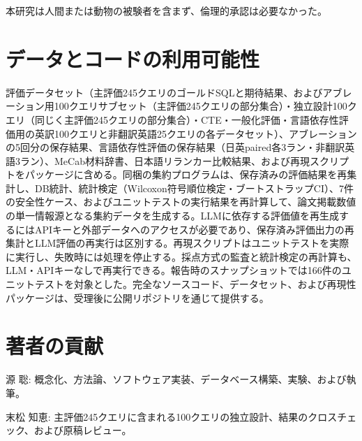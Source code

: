 \documentclass[twocolumn]{interact}
\begin{document}
本研究は人間または動物の被験者を含まず、倫理的承認は必要なかった。

\section*{データとコードの利用可能性}

評価データセット（主評価245クエリのゴールドSQLと期待結果、およびアブレーション用100クエリサブセット（主評価245クエリの部分集合）・独立設計100クエリ（同じく主評価245クエリの部分集合）・CTE・一般化評価・言語依存性評価用の英訳100クエリと非翻訳英語25クエリの各データセット）、アブレーションの5回分の保存結果、言語依存性評価の保存結果（日英paired各3ラン・非翻訳英語3ラン）、MeCab材料辞書、日本語リランカー比較結果、および再現スクリプトをパッケージに含める。同梱の集約プログラムは、保存済みの評価結果を再集計し、DB統計、統計検定（Wilcoxon符号順位検定・ブートストラップCI）、7件の安全性ケース、およびユニットテストの実行結果を再計算して、論文掲載数値の単一情報源となる集約データを生成する。LLMに依存する評価値を再生成するにはAPIキーと外部データへのアクセスが必要であり、保存済み評価出力の再集計とLLM評価の再実行は区別する。再現スクリプトはユニットテストを実際に実行し、失敗時には処理を停止する。採点方式の監査と統計検定の再計算も、LLM・APIキーなしで再実行できる。報告時のスナップショットでは166件のユニットテストを対象とした。完全なソースコード、データセット、および再現性パッケージは、受理後に公開リポジトリを通じて提供する。

\section*{著者の貢献}

源 聡: 概念化、方法論、ソフトウェア実装、データベース構築、実験、および執筆。

末松 知恵: 主評価245クエリに含まれる100クエリの独立設計、結果のクロスチェック、および原稿レビュー。




{\footnotesize

}

\clearpage
\onecolumn
\renewcommand{\topfraction}{0.9}
\renewcommand{\bottomfraction}{0.7}
\renewcommand{\textfraction}{0.05}
\renewcommand{\floatpagefraction}{0.85}
\setcounter{topnumber}{4}
\setcounter{bottomnumber}{3}
\setcounter{totalnumber}{6}
\end{document}
